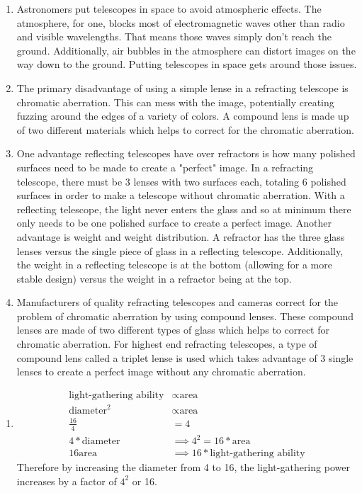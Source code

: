 \documentclass[../hw2.tex]{subfiles}
\begin{document}
    \begin{enumerate}
        \item{} Astronomers put telescopes in space to avoid atmospheric effects. The atmosphere, for one, blocks most of electromagnetic waves other than radio and visible wavelengths. That means those waves simply don't reach the ground. Additionally, air bubbles in the atmosphere can distort images on the way down to the ground. Putting telescopes in space gets around those issues.
        \item The primary disadvantage of using a simple lense in a refracting telescope is chromatic aberration. This can mess with the image, potentially creating fuzzing around the edges of a variety of colors. A compound lens is made up of two different materials which helps to correct for the chromatic aberration.
        \item One advantage reflecting telescopes have over refractors is how many polished surfaces need to be made to create a "perfect" image. In a refracting telescope, there must be 3 lenses with two surfaces each, totaling 6 polished surfaces in order to make a telescope without chromatic aberration. With a reflecting telescope, the light never enters the glass and so at minimum there only needs to be one polished surface to create a perfect image. Another advantage is weight and weight distribution. A refractor has the three glass lenses versus the single piece of glass in a reflecting telescope. Additionally, the weight in a reflecting telescope is at the bottom (allowing for a more stable design) versus the weight in a refractor being at the top.
        \item Manufacturers of quality refracting telescopes and cameras correct for the problem of chromatic aberration by using compound lenses. These compound lenses are made of two different types of glass which helps to correct for chromatic aberration. For highest end refracting telescopes, a type of compound lens called a triplet lense is used which takes advantage of 3 single lenses to create a perfect image without any chromatic aberration.
    \end{enumerate}

    \begin{enumerate}
        \item \begin{align*}
            \text{light-gathering ability} &\propto \text{area}\\
            \text{diameter}^2 &\propto \text{area}\\
            \frac{16}{4} &= 4\tag*{so}\\
            4 * \text{diameter} &\implies 4^2=16 * \text{area}\\
            16 \text{area} &\implies 16 * \text{light-gathering ability}
        \end{align*}
        Therefore by increasing the diameter from 4 to 16, the light-gathering power increases by a factor of $4^2$ or 16.
    \end{enumerate}
\end{document}
